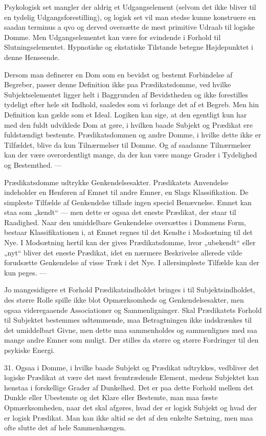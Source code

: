 \documentclass[12pt,a4paper]{book}
\newcommand{\opage}[1]{\marginnote{\footnotesize\textit{[#1]}}}
\begin{document}
Psykologisk set mangler der aldrig et Udgangselement (selvom det ikke
bliver til en tydelig Udgangsforestilling), og logisk set vil man stedse
kunne konstruere en saadan terminus a qvo og derved oversætte de mest
primitive Udraab til logiske Domme. Men Udgangselementet kan være
for%
\opage{87}svindende i Forhold til Slutningselementet. Hypnotiske og ekstatiske
Tilstande betegne Højdepunktet i denne Henseende.

Dersom man definerer en Dom som en bevidst og bestemt Forbindelse af
Begreber, passer denne Definition ikke paa Prædikatsdomme, ved hvilke
Subjektselementet ligger helt i Baggrunden af Bevidstheden og ikke
forestilles tydeligt efter hele sit Indhold, saaledes som vi forlange
det af et Begreb. Men hin Definition kan gælde som et Ideal. Logiken kan
sige, at den egentligt kun har med den fuldt udviklede Dom at gøre, i
hvilken baade Subjekt og Prædikat ere fuldstændigt bestemte.
Prædikatsdommen og andre Domme, i hvilke dette ikke er Tilfældet, blive
da kun Tilnærmelser til Domme. Og af saadanne Tilnærmelser kan der være
overordentligt mange, da der kan være mange Grader i Tydelighed og
Bestemthed. ---

Prædikatsdomme udtrykke Genkendelsesakter. Prædikatets Anvendelse
indeholder en Henføren af Emnet til andre Emner, en Slags
Klassifikation. De simpleste Tilfælde af Genkendelse tillade ingen
speciel Benævnelse. Emnet kan staa som „kendt“ --- men dette er ogsaa
det eneste Prædikat, der staar til Raadighed. Naar den umiddelbare
Genkendelse oversættes i Dommens Form, bestaar Klassifikationen i, at
Emnet regnes til det Kendte i Modsætning til det Nye. I Modsætning
hertil kan der gives Prædikatsdomme, hvor „ubekendt“ eller „nyt“ bliver
det eneste Prædikat, idet en nærmere Beskrivelse allerede vilde
forudsætte Genkendelse af visse Træk i det Nye. I allersimpleste
Tilfælde kan der kun peges. ---

Jo mangesidigere et Forhold Prædikatsindholdet bringes i til
Subjektsindholdet, des større Rolle spille ikke blot Opmærksomheds og
Genkendelsesakter, men ogsaa videregaaende Associationer og
Sammenligninger. Skal Prædikatets Forhold til Subjektet bestemmes
udtømmende, maa Betragtningen ikke indskrænkes til det umiddelbart
Givne, men dette maa sammenholdes og sammenlignes med saa mange andre
Emner som muligt. Der stilles da større og større Fordringer til den
psykiske Energi.

31. Ogsaa i Domme, i hvilke baade Subjekt og Prædikat
\opage{88}udtrykkes,
vedbliver det logiske Prædikat at være det mest fremtrædende Element,
medens Subjektet kan henstaa i forskellige Grader af Dunkelhed. Det er
paa dette Forhold mellem det Dunkle eller Ubestemte og det Klare eller
Bestemte, man maa fæste Opmærksomheden, naar det skal afgøres, hvad der
er logisk Subjekt og hvad der er logisk Prædikat. Man kan ikke altid se
det af den enkelte Sætning, men maa ofte slutte det af hele
Sammenhængen.
\end{document}
